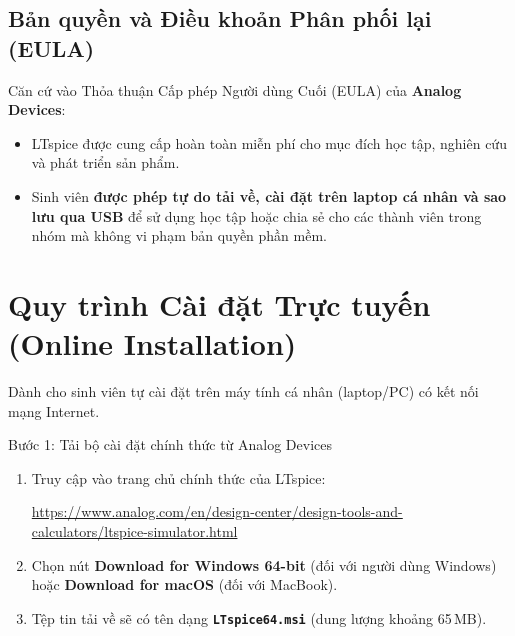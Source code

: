 \documentclass[11pt,a4paper]{article}
\newcommand{\code}[1]{\texttt{\color{navy}\textbf{#1}}}
\begin{document}
\subsection{Bản quyền và Điều khoản Phân phối lại (EULA)}
Căn cứ vào Thỏa thuận Cấp phép Người dùng Cuối (EULA) của \textbf{Analog Devices}:
\begin{itemize}[itemsep=2pt]
  \item LTspice được cung cấp hoàn toàn miễn phí cho mục đích học tập, nghiên cứu và phát triển sản phẩm.
  \item Sinh viên \textbf{được phép tự do tải về, cài đặt trên laptop cá nhân và sao lưu qua USB} để sử dụng học tập hoặc chia sẻ cho các thành viên trong nhóm mà không vi phạm bản quyền phần mềm.
\end{itemize}

\section{Quy trình Cài đặt Trực tuyến (Online Installation)}
\label{sec:online}

Dành cho sinh viên tự cài đặt trên máy tính cá nhân (laptop/PC) có kết nối mạng Internet.

\begin{stepbox}{Bước 1: Tải bộ cài đặt chính thức từ Analog Devices}
\begin{enumerate}[itemsep=2pt]
  \item Truy cập vào trang chủ chính thức của LTspice:
  \begin{center}
    \url{https://www.analog.com/en/design-center/design-tools-and-calculators/ltspice-simulator.html}
  \end{center}
  \item Chọn nút \textbf{Download for Windows 64-bit} (đối với người dùng Windows) hoặc \textbf{Download for macOS} (đối với MacBook).
  \item Tệp tin tải về sẽ có tên dạng \code{LTspice64.msi} (dung lượng khoảng 65\,MB).
\end{enumerate}
\end{stepbox}
\end{document}
